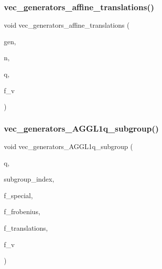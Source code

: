 \subsubsection{\texorpdfstring{vec\+\_\+generators\+\_\+affine\+\_\+translations()}{vec\_generators\_affine\_translations()}\hspace{0.1cm}{\footnotesize\ttfamily [2/2]}}
{\footnotesize\ttfamily void vec\+\_\+generators\+\_\+affine\+\_\+translations (\begin{DoxyParamCaption}\item[{\mbox{\hyperlink{class_vector}{Vector}} \&}]{gen,  }\item[{\mbox{\hyperlink{galois_8h_a09fddde158a3a20bd2dcadb609de11dc}{I\+NT}}}]{n,  }\item[{\mbox{\hyperlink{galois_8h_a09fddde158a3a20bd2dcadb609de11dc}{I\+NT}}}]{q,  }\item[{\mbox{\hyperlink{galois_8h_a09fddde158a3a20bd2dcadb609de11dc}{I\+NT}}}]{f\+\_\+v }\end{DoxyParamCaption})}

\mbox{\label{perm__group__gens_8_c_a93659c1c7a668dd6adf9f217c608e1f1}} 
\subsubsection{\texorpdfstring{vec\+\_\+generators\+\_\+\+A\+G\+G\+L1q\+\_\+subgroup()}{vec\_generators\_AGGL1q\_subgroup()}}
{\footnotesize\ttfamily void vec\+\_\+generators\+\_\+\+A\+G\+G\+L1q\+\_\+subgroup (\begin{DoxyParamCaption}\item[{\mbox{\hyperlink{galois_8h_a09fddde158a3a20bd2dcadb609de11dc}{I\+NT}}}]{q,  }\item[{\mbox{\hyperlink{galois_8h_a09fddde158a3a20bd2dcadb609de11dc}{I\+NT}}}]{subgroup\+\_\+index,  }\item[{\mbox{\hyperlink{galois_8h_a09fddde158a3a20bd2dcadb609de11dc}{I\+NT}}}]{f\+\_\+special,  }\item[{\mbox{\hyperlink{galois_8h_a09fddde158a3a20bd2dcadb609de11dc}{I\+NT}}}]{f\+\_\+frobenius,  }\item[{\mbox{\hyperlink{galois_8h_a09fddde158a3a20bd2dcadb609de11dc}{I\+NT}}}]{f\+\_\+translations,  }\item[{\mbox{\hyperlink{galois_8h_a09fddde158a3a20bd2dcadb609de11dc}{I\+NT}}}]{f\+\_\+v }\end{DoxyParamCaption})}

